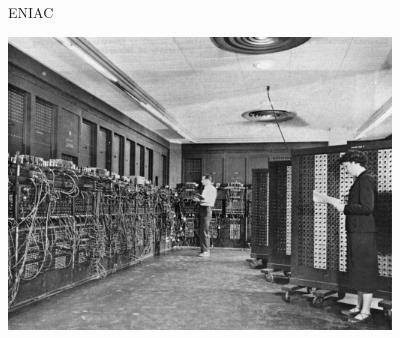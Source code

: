 \documentclass[xcolor={usenames,dvipsnames,svgnames,table},12pt]{beamer}
\begin{document}
\begin{frame}{ENIAC}
  \begin{center}
    \includegraphics[width=4in]{Eniac}
  \end{center}
\end{frame}
\end{document}
